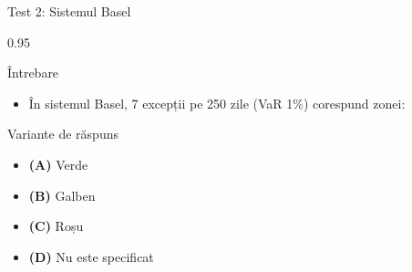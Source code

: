 \documentclass[9pt, aspectratio=169, t]{beamer}
\begin{document}
\begin{frame}{Test 2: Sistemul Basel}
    \begin{cminipage}{0.95\textwidth}
    \begin{alertblock}{Întrebare}
        \begin{itemize}\setlength{\itemsep}{0pt}
            \item În sistemul Basel, 7 excepții pe 250 zile (VaR 1\%) corespund zonei:
        \end{itemize}
    \end{alertblock}

    \begin{block}{Variante de răspuns}
    \begin{itemize}\setlength{\itemsep}{0pt}
        \item \textcolor{MainBlue}{\textbf{(A)}} Verde
        \item \textcolor{MainBlue}{\textbf{(B)}} Galben
        \item \textcolor{MainBlue}{\textbf{(C)}} Roșu
        \item \textcolor{MainBlue}{\textbf{(D)}} Nu este specificat
    \end{itemize}
    \end{block}
    \end{cminipage}
\end{frame}
\end{document}
